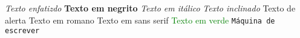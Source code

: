 \emph{Texto enfatizdo}
\textbf{Texto em negrito}
\textit{Texto em itálico}
\textsl{Texto inclinado}
\alert{Texto de alerta}
\textrm{Texto em romano}
\textsf{Texto em sans serif}
\textcolor{green} {Texto em verde}
\texttt{Máquina de escrever}
